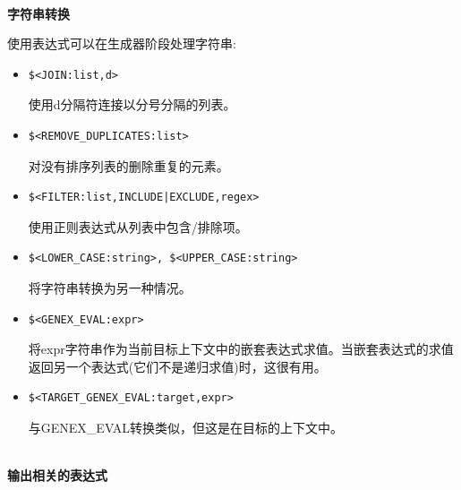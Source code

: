 \hspace*{\fill} \\ %
\noindent
\textbf{字符串转换}

使用表达式可以在生成器阶段处理字符串:

\begin{itemize}
\item 
\begin{lstlisting}[style=styleCMake]
$<JOIN:list,d> 
\end{lstlisting}

使用d分隔符连接以分号分隔的列表。

\item 
\begin{lstlisting}[style=styleCMake]
$<REMOVE_DUPLICATES:list>
\end{lstlisting}

对没有排序列表的删除重复的元素。

\item 
\begin{lstlisting}[style=styleCMake]
$<FILTER:list,INCLUDE|EXCLUDE,regex>
\end{lstlisting}

使用正则表达式从列表中包含/排除项。

\item 
\begin{lstlisting}[style=styleCMake]
$<LOWER_CASE:string>, $<UPPER_CASE:string>
\end{lstlisting}

将字符串转换为另一种情况。

\item 
\begin{lstlisting}[style=styleCMake]
$<GENEX_EVAL:expr>
\end{lstlisting}

将expr字符串作为当前目标上下文中的嵌套表达式求值。当嵌套表达式的求值返回另一个表达式(它们不是递归求值)时，这很有用。

\item 
\begin{lstlisting}[style=styleCMake]
$<TARGET_GENEX_EVAL:target,expr>
\end{lstlisting}

与GENEX\_EVAL转换类似，但这是在目标的上下文中。
\end{itemize}

\hspace*{\fill} \\ %
\noindent
\textbf{输出相关的表达式}

